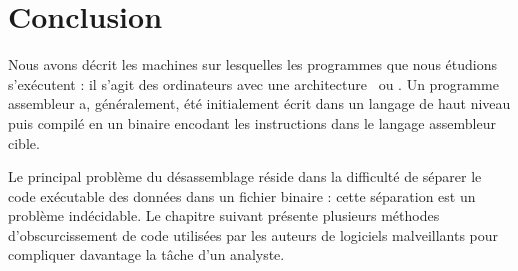 \section{Conclusion}
Nous avons décrit les machines sur lesquelles les programmes que nous étudions s'exécutent : il s'agit des ordinateurs avec une architecture \xq\ ou \xs.
Un programme assembleur a, généralement, été initialement écrit dans un langage de haut niveau puis compilé en un binaire encodant les instructions dans le langage assembleur cible.

Le principal problème du désassemblage réside dans la difficulté de séparer le code exécutable des données dans un fichier binaire : cette séparation est un problème indécidable.
Le chapitre suivant présente plusieurs méthodes d'obscurcissement de code utilisées par les auteurs de logiciels malveillants pour compliquer davantage la tâche d'un analyste.
